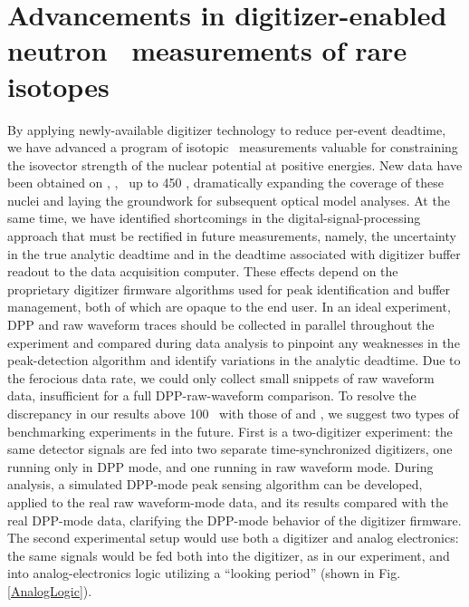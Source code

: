 \section{Advancements in digitizer-enabled neutron \tot\ measurements of rare
isotopes}
By applying newly-available digitizer technology to reduce per-event deadtime,
we have advanced a program of isotopic \tot\ 
measurements valuable for constraining the isovector strength of the nuclear potential at positive 
energies. New data have been obtained on \oEight, \niEightFour, \snTwelveFour\ up
to 450 \mega\electronvolt, dramatically expanding the coverage of these nuclei
and laying the groundwork for subsequent optical model analyses. At the same
time, we have identified shortcomings in the digital-signal-processing approach
that must be rectified in future measurements, namely, the uncertainty in the
true analytic deadtime and in the deadtime associated with digitizer buffer
readout to the data acquisition computer. These effects depend on
the proprietary digitizer firmware algorithms used for peak
identification and buffer management, both of which are opaque to the
end user. In an ideal experiment, DPP and raw waveform traces should be collected
in parallel throughout the experiment and compared during data analysis to
pinpoint any weaknesses in the peak-detection algorithm and identify variations in the analytic
deadtime. Due to the ferocious data rate, we could only
collect small snippets of raw waveform data, insufficient for a full
DPP-raw-waveform comparison.
To resolve the discrepancy in our results above 100
\mega\electronvolt\ with those of \cite{Finlay1993} and \cite{Abfalterer2001},
we suggest two types of benchmarking experiments in the future. First is a
two-digitizer experiment: the same detector signals are fed into two
separate time-synchronized digitizers, one running only in DPP mode,
and one running in raw waveform mode. During analysis, a simulated DPP-mode peak sensing
algorithm can be developed, applied to the real raw waveform-mode data, and its
results compared with the real DPP-mode data, clarifying the DPP-mode behavior of
the digitizer firmware. The second experimental setup would use
both a digitizer and analog electronics:
the same signals would be fed both into the digitizer, as
in our experiment, and into analog-electronics logic utilizing a ``looking
period'' (shown in Fig. \ref{AnalogLogic}).

